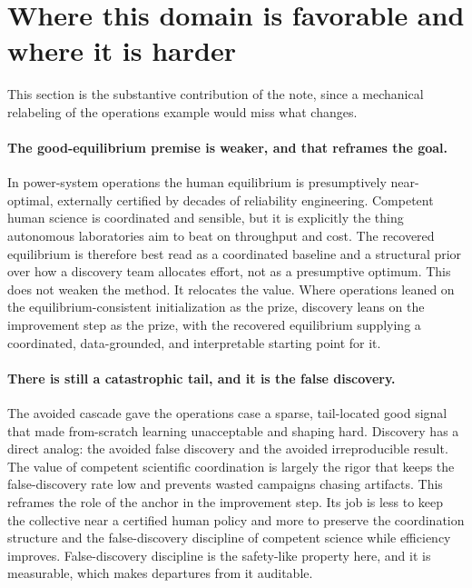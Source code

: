\documentclass[11pt]{article}
\theoremstyle{definition}
\begin{document}
\section{Where this domain is favorable and where it is harder}

This section is the substantive contribution of the note, since a mechanical relabeling of the operations example would miss what changes.

\paragraph{The good-equilibrium premise is weaker, and that reframes the goal.}
In power-system operations the human equilibrium is presumptively near-optimal, externally certified by decades of reliability engineering. Competent human science is coordinated and sensible, but it is explicitly the thing autonomous laboratories aim to beat on throughput and cost. The recovered equilibrium is therefore best read as a coordinated baseline and a structural prior over how a discovery team allocates effort, not as a presumptive optimum. This does not weaken the method. It relocates the value. Where operations leaned on the equilibrium-consistent initialization as the prize, discovery leans on the improvement step as the prize, with the recovered equilibrium supplying a coordinated, data-grounded, and interpretable starting point for it.

\paragraph{There is still a catastrophic tail, and it is the false discovery.}
The avoided cascade gave the operations case a sparse, tail-located good signal that made from-scratch learning unacceptable and shaping hard. Discovery has a direct analog: the avoided false discovery and the avoided irreproducible result. The value of competent scientific coordination is largely the rigor that keeps the false-discovery rate low and prevents wasted campaigns chasing artifacts. This reframes the role of the anchor in the improvement step. Its job is less to keep the collective near a certified human policy and more to preserve the coordination structure and the false-discovery discipline of competent science while efficiency improves. False-discovery discipline is the safety-like property here, and it is measurable, which makes departures from it auditable.
\end{document}

